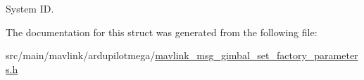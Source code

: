 System I\+D. 



The documentation for this struct was generated from the following file\+:\begin{DoxyCompactItemize}
\item 
src/main/mavlink/ardupilotmega/\hyperlink{mavlink__msg__gimbal__set__factory__parameters_8h}{mavlink\+\_\+msg\+\_\+gimbal\+\_\+set\+\_\+factory\+\_\+parameters.\+h}\end{DoxyCompactItemize}
